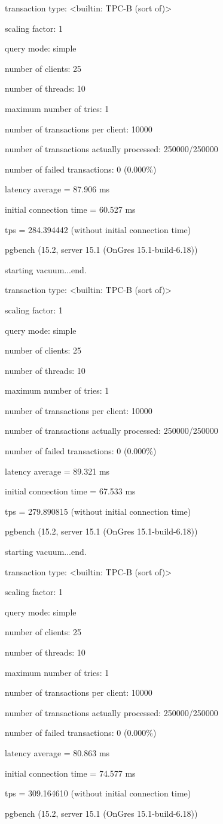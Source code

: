 transaction type: <builtin: TPC-B (sort of)>

scaling factor: 1

query mode: simple

number of clients: 25

number of threads: 10

maximum number of tries: 1

number of transactions per client: 10000

number of transactions actually processed: 250000/250000

number of failed transactions: 0 (0.000\%)

latency average = 87.906 ms

initial connection time = 60.527 ms

tps = 284.394442 (without initial connection time)

pgbench (15.2, server 15.1 (OnGres 15.1-build-6.18))

starting vacuum...end.

transaction type: <builtin: TPC-B (sort of)>

scaling factor: 1

query mode: simple

number of clients: 25

number of threads: 10

maximum number of tries: 1

number of transactions per client: 10000

number of transactions actually processed: 250000/250000

number of failed transactions: 0 (0.000\%)

latency average = 89.321 ms

initial connection time = 67.533 ms

tps = 279.890815 (without initial connection time)


pgbench (15.2, server 15.1 (OnGres 15.1-build-6.18))

starting vacuum...end.

transaction type: <builtin: TPC-B (sort of)>

scaling factor: 1

query mode: simple

number of clients: 25

number of threads: 10

maximum number of tries: 1

number of transactions per client: 10000

number of transactions actually processed: 250000/250000

number of failed transactions: 0 (0.000\%)

latency average = 80.863 ms

initial connection time = 74.577 ms

tps = 309.164610 (without initial connection time)

pgbench (15.2, server 15.1 (OnGres 15.1-build-6.18))

